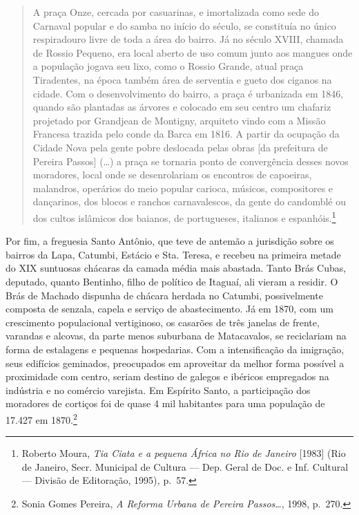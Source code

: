 \begin{quote}
A praça Onze, cercada por casuarinas, e imortalizada como sede do
Carnaval popular e do samba no início do século, se constituía no único
respiradouro livre de toda a área do bairro. Já no século XVIII, chamada
de Rossio Pequeno, era local aberto de uso comum junto aos mangues onde
a população jogava seu lixo, como o Rossio Grande, atual praça
Tiradentes, na época também área de serventia e gueto dos ciganos na
cidade. Com o desenvolvimento do bairro, a praça é urbanizada em 1846,
quando são plantadas as árvores e colocado em seu centro um chafariz
projetado por Grandjean de Montigny, arquiteto vindo com a Missão
Francesa trazida pelo conde da Barca em 1816. A partir da ocupação da
Cidade Nova pela gente pobre deslocada pelas obras {[}da prefeitura de
Pereira Passos{]} (\ldots{}) a praça se tornaria ponto de convergência
desses novos moradores, local onde se desenrolariam os encontros de
capoeiras, malandros, operários do meio popular carioca, músicos,
compositores e dançarinos, dos blocos e ranchos carnavalescos, da gente
do candomblé ou dos cultos islâmicos dos baianos, de portugueses,
italianos e espanhóis.\footnote{Roberto Moura, \textit{Tia Ciata e a
  pequena África no Rio de Janeiro} {[}1983{]} (Rio de Janeiro, Secr.
  Municipal de Cultura --- Dep. Geral de Doc. e Inf. Cultural --- Divisão
  de Editoração, 1995)\textit{,} p.~57.}
\end{quote}

Por fim, a freguesia Santo Antônio, que teve de antemão a jurisdição
sobre os bairros da Lapa, Catumbi, Estácio e Sta. Teresa, e recebeu na
primeira metade do XIX suntuosas chácaras da camada média mais abastada.
Tanto Brás Cubas, deputado, quanto Bentinho, filho de político de
Itaguaí, ali vieram a residir. O Brás de Machado dispunha de chácara
herdada no Catumbi, possivelmente composta de senzala, capela e serviço
de abastecimento. Já em 1870, com um crescimento populacional
vertiginoso, os casarões de três janelas de frente, varandas e alcovas,
da parte menos suburbana de Matacavalos, se reciclariam na forma de
estalagens e pequenas hospedarias. Com a intensificação da imigração,
seus edifícios geminados, preocupados em aproveitar da melhor forma
possível a proximidade com centro, seriam destino de galegos e ibéricos
empregados na indústria e no comércio varejista. Em Espírito Santo, a
participação dos moradores de cortiços foi de quase 4 mil habitantes
para uma população de 17.427 em 1870.\footnote{Sonia Gomes Pereira,
  \textit{A Reforma Urbana de Pereira Passos}\ldots{}, 1998, p.~270.}

